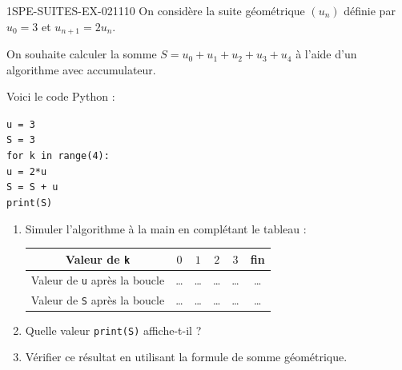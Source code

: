 \begin{exercice}{1SPE-SUITES-EX-021}{1}{10}
On considère la suite géométrique $(u_n)$ définie par $u_0 = 3$ et $u_{n+1} = 2u_n$.

On souhaite calculer la somme $S = u_0 + u_1 + u_2 + u_3 + u_4$ à l'aide d'un algorithme avec accumulateur.

Voici le code Python :

\begin{center}
\texttt{u = 3}\\
\texttt{S = 3}\\
\texttt{for k in range(4):}\\
\texttt{\quad\quad u = 2*u}\\
\texttt{\quad\quad S = S + u}\\
\texttt{print(S)}
\end{center}

\begin{enumerate}
  \item Simuler l'algorithme à la main en complétant le tableau :

  \medskip
  \begin{tabular}{|c|c|c|c|c|c|}
    \hline
    Valeur de \texttt{k} & $0$ & $1$ & $2$ & $3$ & fin \\
    \hline
    Valeur de \texttt{u} après la boucle & \dots & \dots & \dots & \dots & \dots \\
    \hline
    Valeur de \texttt{S} après la boucle & \dots & \dots & \dots & \dots & \dots \\
    \hline
  \end{tabular}
  \medskip

  \item Quelle valeur \texttt{print(S)} affiche-t-il ?
  \item Vérifier ce résultat en utilisant la formule de somme géométrique.
\end{enumerate}
\end{exercice}
